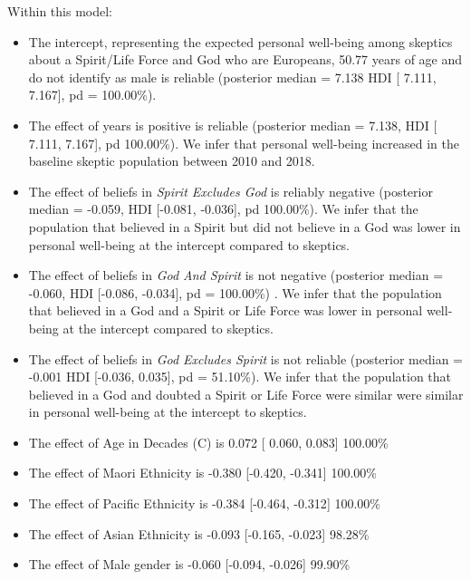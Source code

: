 \documentclass[
  english,
  man,floatsintext]{apa6}
\providecommand{\tightlist}{%
  \setlength{\itemsep}{0pt}\setlength{\parskip}{0pt}}
\begin{document}
Within this model:

\begin{itemize}
\tightlist
\item
  The intercept, representing the expected personal well-being among skeptics about a Spirit/Life Force and God who are Europeans, 50.77 years of age and do not identify as male is reliable (posterior median = 7.138 HDI {[} 7.111, 7.167{]}, pd = 100.00\%).\\
\item
  The effect of years is positive is reliable (posterior median = 7.138, HDI {[} 7.111, 7.167{]}, pd 100.00\%). We infer that personal well-being increased in the baseline skeptic population between 2010 and 2018.
\item
  The effect of beliefs in \emph{Spirit Excludes God} is reliably negative (posterior median = -0.059, HDI {[}-0.081, -0.036{]}, pd 100.00\%). We infer that the population that believed in a Spirit but did not believe in a God was lower in personal well-being at the intercept compared to skeptics.
\item
  The effect of beliefs in \emph{God And Spirit} is not negative (posterior median = -0.060, HDI {[}-0.086, -0.034{]}, pd = 100.00\%) . We infer that the population that believed in a God and a Spirit or Life Force was lower in personal well-being at the intercept compared to skeptics.
\item
  The effect of beliefs in \emph{God Excludes Spirit} is not reliable (posterior median = -0.001 HDI {[}-0.036, 0.035{]}, pd = 51.10\%). We infer that the population that believed in a God and doubted a Spirit or Life Force were similar were similar in personal well-being at the intercept to skeptics.
\item
  The effect of Age in Decades (C) is 0.072 \textbar{} {[} 0.060, 0.083{]} \textbar{} 100.00\% \textbar{}
\item
  The effect of Maori Ethnicity is -0.380 \textbar{} {[}-0.420, -0.341{]} \textbar{} 100.00\% \textbar{}
\item
  The effect of Pacific Ethnicity is -0.384 \textbar{} {[}-0.464, -0.312{]} \textbar{} 100.00\% \textbar{}
\item
  The effect of Asian Ethnicity is -0.093 \textbar{} {[}-0.165, -0.023{]} \textbar{} 98.28\% \textbar{}\\
\item
  The effect of Male gender is -0.060 \textbar{} {[}-0.094, -0.026{]} \textbar{} 99.90\% \textbar{}
\end{itemize}
\end{document}
